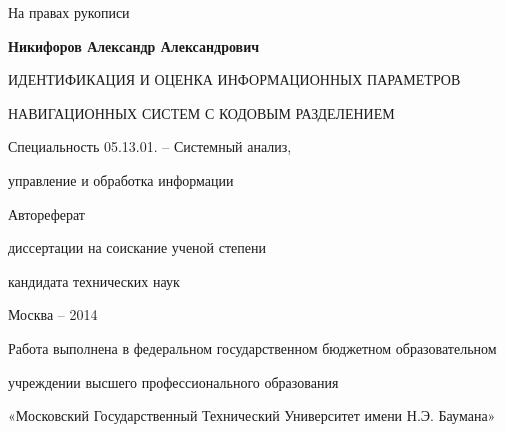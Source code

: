 \hfill На правах рукописи

\vspace{\baselineskip}
\vspace{\baselineskip}
\vspace{\baselineskip}

\noindent\centerline{\bf{Никифоров Александр Александрович}}

\vspace{\baselineskip}
\vspace{\baselineskip}
\vspace{\baselineskip}

\noindent\centerline{ИДЕНТИФИКАЦИЯ И ОЦЕНКА ИНФОРМАЦИОННЫХ ПАРАМЕТРОВ}
\noindent\centerline{НАВИГАЦИОННЫХ СИСТЕМ С КОДОВЫМ РАЗДЕЛЕНИЕМ}

\vspace{\baselineskip}
\vspace{\baselineskip}
\vspace{\baselineskip}

\noindent\centerline{Специальность 05.13.01. – Системный анализ,}
\noindent\centerline{управление и обработка информации}

\vspace{\baselineskip}
\vspace{\baselineskip}
\vspace{\baselineskip}

\noindent\centerline{Автореферат} 
\noindent\centerline{диссертации на соискание ученой степени}
\noindent\centerline{кандидата технических наук}


\vfill
\noindent\centerline{Москва – 2014}

\newpage

\noindent\centerline{Работа выполнена в федеральном государственном бюджетном образовательном}
\noindent\centerline{учреждении высшего профессионального образования}
\noindent\centerline{«Московский Государственный Технический Университет имени Н.Э. Баумана»}
\vspace{\baselineskip}

